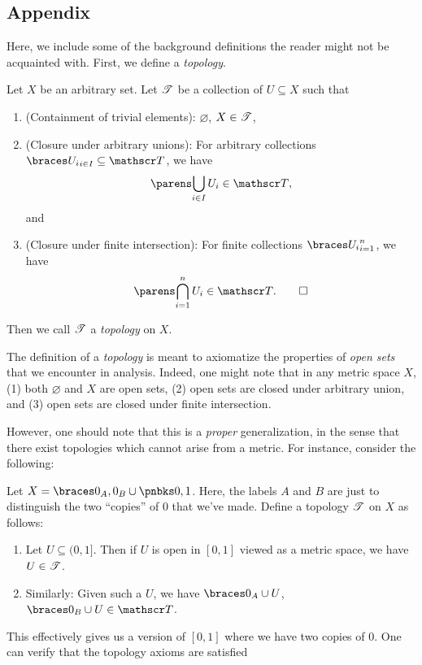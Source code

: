 \documentclass{fkpaper}
\begin{document}
\begin{multicols}{2}
\section{Appendix}
Here, we include some of the background definitions the reader might
not be acquainted with. First, we define a \emph{topology}.
\begin{definition}[Topology]
  Let $X$ be an arbitrary set. Let ${\mathscr{T}}$ be a collection of $U
  \subseteq X$ such that
  \begin{enumerate}
    \item (Containment of trivial elements): $\varnothing$, $X \in {\mathscr{T}}$,
    \item (Closure under arbitrary unions): For arbitrary collections
      $\set{U_i}_{i \in I} \subseteq \ms T$, we have
      \[
      \pn{\bigcup_{i \in I} U_i } \in \ms T,
      \]
      and
    \item (Closure under finite intersection): For finite collections
      $\set{U_i}_{i = 1}^n$, we have
      \[
      \pn{\bigcap_{i=1}^n U_i} \in \ms T. \qedhere
      \]
  \end{enumerate}
  Then we call ${\mathscr{T}}$ a \emph{topology} on $X$.
\end{definition}
The definition of a \emph{topology} is meant to axiomatize the
properties of \emph{open sets} that we encounter in analysis. Indeed,
one might note that in any metric space $X$, (1) both $\varnothing$
and $X$ are open sets, (2) open sets are closed under arbitrary union,
and (3) open sets are closed under finite intersection.

However, one should note that this is a \emph{proper} generalization,
in the sense that there exist topologies which cannot arise from a
metric. For instance, consider the following:
\begin{definition}
  Let $X = \set{0_{A}, 0_{B}} \cup \pb{0, 1}$. Here, the labels $A$
  and $B$ are just to distinguish the two ``copies'' of $0$ that we've
  made. Define a topology ${\mathscr{T}}$ on $X$ as follows:
  \begin{enumerate}
    \item Let $U \subseteq (0,1]$. Then if $U$ is open in $[0,1]$
      viewed as a metric space, we have $U \in {\mathscr{T}}$.
    \item Similarly: Given such a $U$, we have $\set{0_A} \cup U$,
      $\set{0_B} \cup U \in \ms T$. \qedhere
  \end{enumerate}
\end{definition}
This effectively gives us a version of $[0,1]$ where we have two
copies of $0$. One can verify that the topology axioms are satisfied


\end{multicols}
\end{document}
